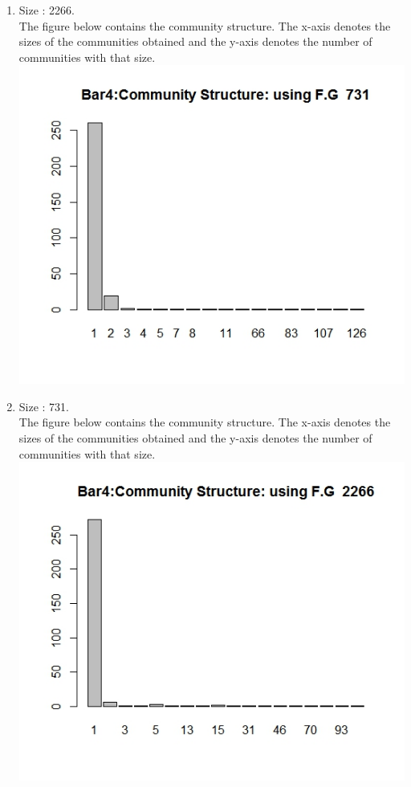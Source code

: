 \documentclass{article}
\begin{document}
\begin{enumerate}
 \item 
 Size : 2266.\\
 The figure below contains the community structure. The x-axis denotes the sizes of the communities obtained
 and the y-axis denotes the number of communities with that size.\\
 \includegraphics[scale=0.4]{p11}
 
 \item 
 Size : 731.\\
 The figure below contains the community structure. The x-axis denotes the sizes of the communities obtained
 and the y-axis denotes the number of communities with that size.\\
 \includegraphics[scale=0.4]{p12}
 

\end{enumerate}
\end{document}
